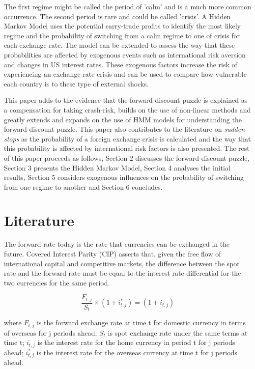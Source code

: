 \documentclass[12pt, a4paper, oneside]{article}\usepackage[]{graphicx}\usepackage[]{color}
\begin{document}
The first regime might be called the period of 'calm' and is a much more common occurrence. The second period is rare and could be called 'crisis'.  A Hidden Markov Model uses the potential carry-trade profits to identify the most likely regime and the probability of switching from a calm regime to one of crisis for each exchange rate. The model can be extended to assess the way that these probabilities are affected by exogenous events such as international risk aversion and changes in US interest rates.  These exogenous factors increase the risk of experiencing an exchange rate crisis and can be used to compare how vulnerable each country is to these type of external shocks. 



This paper adds to the evidence that the forward-discount puzzle is explained as a compensation for taking crash-risk, builds on the use of non-linear methods  and greatly extends and expands on the use of HMM models for understanding the forward-discount puzzle.  This paper also contributes to the literature on \emph{sudden stops} as the probability of a foreign exchange crisis is calculated and the way that this probability is affected by international risk factors is also presented. The rest of this paper proceeds as follows, Section 2 discusses the forward-discount puzzle, Section 3 presents the Hidden Markov Model, Section 4 analyses the initial results, Section 5 considers exogenous influences on the probability of switching from one regime to another and Section 6 concludes. 

\section{Literature}
 \label{secref:UIP}
The forward rate today is the rate that currencies can be exchanged in the future.  Covered Interest Parity (CIP) asserts that, given the free flow of international capital and competitive markets,  the difference between the spot rate and the forward rate must be equal to the interest rate differential for the two currencies for the same period.    

\begin{equation}
\frac{F_{t, j}}{S_t} \times (1 + i_{t,j}^*) = (1 + i_{t,j})  
\end{equation}

where $F_{t, j}$ is the forward exchange rate at time t for domestic currency in terms of overseas for j periods ahead;  $S_t$ is spot exchange rate under the same terms at time t; $i_{t,j}$ is the interest rate for the home currency in period t for j periods ahead; $i_{t, j}^*$ is the interest rate for the overseas currency at time t for j periods ahead.
\end{document}

